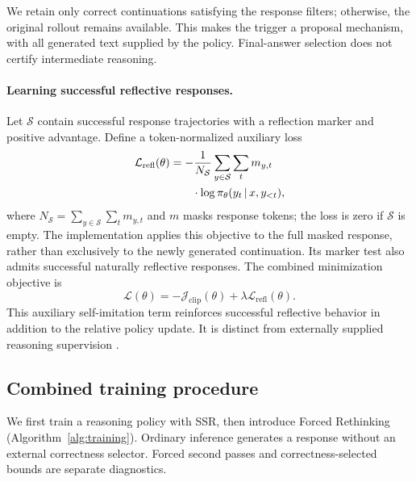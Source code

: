 \documentclass[twocolumn]{article}
\newcommand{\given}{\,\vert\,}
\begin{document}
We retain only correct continuations satisfying the response filters; otherwise, the original rollout remains available. This makes the trigger a proposal mechanism, with all generated text supplied by the policy. Final-answer selection does not certify intermediate reasoning.

\paragraph{Learning successful reflective responses.}
Let $\mathcal S$ contain successful response trajectories with a reflection marker and positive advantage. Define a token-normalized auxiliary loss
\begin{align}
 \mathcal L_{\mathrm{refl}}(\theta)
 &=-\frac{1}{N_{\mathcal S}}\sum_{y\in\mathcal S}\sum_t m_{y,t}\nonumber\\
 &\hspace{7mm}\cdot\log\pi_\theta(y_t\given x,y_{<t}),
 \label{eq:sft}
\end{align}
where $N_{\mathcal S}=\sum_{y\in\mathcal S}\sum_t m_{y,t}$ and $m$ masks response tokens; the loss is zero if $\mathcal S$ is empty. The implementation applies this objective to the full masked response, rather than exclusively to the newly generated continuation. Its marker test also admits successful naturally reflective responses. The combined minimization objective is
\begin{equation}
 \mathcal L(\theta)=-\mathcal J_{\mathrm{clip}}(\theta)
 +\lambda\mathcal L_{\mathrm{refl}}(\theta).
 \label{eq:total}
\end{equation}
This auxiliary self-imitation term reinforces successful reflective behavior in addition to the relative policy update. It is distinct from externally supplied reasoning supervision \citep{OpenVLThinker,R1OneVision}.

\subsection{Combined training procedure}

We first train a reasoning policy with SSR, then introduce Forced Rethinking (Algorithm~\ref{alg:training}). Ordinary inference generates a response without an external correctness selector. Forced second passes and correctness-selected bounds are separate diagnostics.
\end{document}
